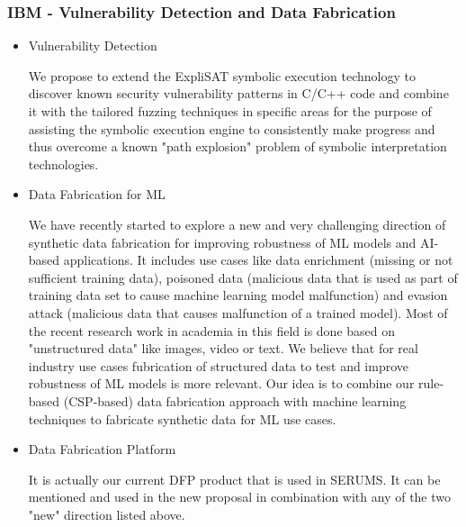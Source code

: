 \documentclass[a4paper,11pt]{article}
\begin{document}
\subsubsection{IBM - Vulnerability Detection and Data Fabrication}
\begin{itemize}
\item  Vulnerability Detection
   
We propose to extend the ExpliSAT symbolic execution technology to discover known security vulnerability patterns in C/C++ code and combine it with the tailored fuzzing techniques in specific areas for the purpose of assisting the symbolic execution engine to consistently make progress and thus overcome a known "path explosion" problem of symbolic interpretation technologies.
 
\item Data Fabrication for ML
 
We have recently started to explore a new and very challenging direction of synthetic data fabrication for improving robustness of ML models and AI-based applications. It includes  use cases like data enrichment (missing or not sufficient training data), poisoned data (malicious data that is used as part of training data set to cause machine learning model malfunction) and evasion attack (malicious data that causes malfunction of a trained model).
Most of the recent research work in academia in this field is done based on "unstructured data" like images, video or text. We believe that for real industry use cases fubrication of structured data to test and improve robustness of ML models is more relevant. Our idea is to combine our rule-based (CSP-based) data fabrication approach with machine learning techniques to fabricate synthetic data for ML use cases.
 
\item Data Fabrication Platform
 
It is actually our current DFP product that is used in SERUMS. It can be mentioned and used in the new proposal in combination with any of the two "new" direction listed above.
\end{itemize}
\end{document}

